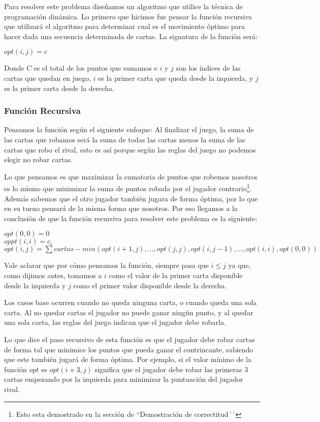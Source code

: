 Para resolver este problema diseñamos un algoritmo que utilice la técnica de programación dinámica. Lo primero que hicimos fue pensar la función recursiva que utilizará el algoritmo para determinar cual es el movimiento óptimo para hacer dada una secuencia determinada de cartas. La signatura de la función será:

$opt(i,j) = c$

Donde $C$ es el total de los puntos que sumamos e $i$ y $j$ son los índices de las cartas que quedan en juego, $i$ es la primer carta que queda desde la izquierda, y $j$ es la primer carta desde la derecha.

\subsubsection{Función Recursiva}

Pensamos la función según el siguiente enfoque: Al finalizar el juego, la suma de las cartas que robamos será la suma de todas las cartas menos la suma de las cartas que robo el rival, esto es así porque según las reglas del juego no podemos elegir no robar cartas.

Lo que pensamos es que maximizar la sumatoria de puntos que robemos nosotros es lo mismo que minimizar la suma de puntos robada por el jugador contrario\footnote{Esto esta demostrado en la sección de ``Demostración de correctitud´´}. Además sabemos que el otro jugador también jugara de forma óptima, por lo que en su turno pensará de la misma forma que nosotros. Por eso llegamos a la conclusión de que la función recursiva para resolver este problema es la siguiente:

$opt(0,0) = 0$ \\
$oppt(i,i) = c_i$ \\
$opt(i,j) = \sum cartas - min(opt(i+1, j), ..., opt(j,j), opt(i, j-1), ... ,opt(i,i), opt(0,0))$

Vale aclarar que por cómo pensamos la función, siempre pasa que $i \leq j$ ya que, como dijimos antes, tomamos a $i$ como el valor de la primer carta disponible desde la izquierda y $j$ como el primer valor disponible desde la derecha.

Los casos base ocurren cuando no queda ninguna carta, o cuando queda una sola carta. Al no quedar cartas el jugador no puede ganar ningún punto, y al quedar una sola carta, las reglas del juego indican que el jugador debe robarla.

Lo que dice el paso recursivo de esta función es que el jugador debe robar cartas de forma tal que minimice los puntos que pueda ganar el contrincante, sabiendo que este también jugará de forma óptima. Por ejemplo, si el valor mínimo de la función $opt$ es $opt(i+3,j)$ significa que el jugador debe robar las primeras 3 cartas empezando por la izquierda para minimizar la puntuación del jugador rival.

